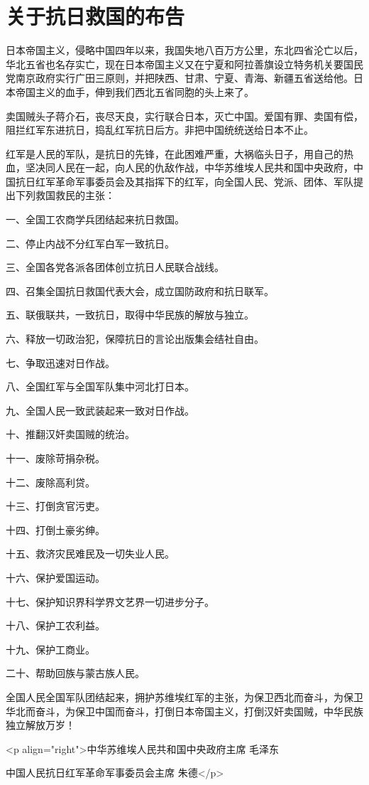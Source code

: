 \section[关于抗日救国的布告（一九三六年六月一日）]{关于抗日救国的布告}


日本帝国主义，侵略中国四年以来，我国失地八百万方公里，东北四省沦亡以后，华北五省也名存实亡，现在日本帝国主义又在宁夏和阿拉善旗设立特务机关要国民党南京政府实行广田三原则，并把陕西、甘肃、宁夏、青海、新疆五省送给他。日本帝国主义的血手，伸到我们西北五省同胞的头上来了。

卖国贼头子蒋介石，丧尽天良，实行联合日本，灭亡中国。爱国有罪、卖国有偿，阻拦红军东进抗日，捣乱红军抗日后方。非把中国统统送给日本不止。

红军是人民的军队，是抗日的先锋，在此困难严重，大祸临头日子，用自己的热血，坚决同人民在一起，向人民的仇敌作战，中华苏维埃人民共和国中央政府，中国抗日红军革命军事委员会及其指挥下的红军，向全国人民、党派、团体、军队提出下列救国救民的主张：

一、全国工农商学兵团结起来抗日救国。

二、停止内战不分红军白军一致抗日。

三、全国各党各派各团体创立抗日人民联合战线。

四、召集全国抗日救国代表大会，成立国防政府和抗日联军。

五、联俄联共，一致抗日，取得中华民族的解放与独立。

六、释放一切政治犯，保障抗日的言论出版集会结社自由。

七、争取迅速对日作战。

八、全国红军与全国军队集中河北打日本。

九、全国人民一致武装起来一致对日作战。

十、推翻汉奸卖国贼的统治。

十一、废除苛捐杂税。

十二、废除高利贷。

十三、打倒贪官污吏。

十四、打倒土豪劣绅。

十五、救济灾民难民及一切失业人民。

十六、保护爱国运动。

十七、保护知识界科学界文艺界一切进步分子。

十八、保护工农利益。

十九、保护工商业。

二十、帮助回族与蒙古族人民。

全国人民全国军队团结起来，拥护苏维埃红军的主张，为保卫西北而奋斗，为保卫华北而奋斗，为保卫中国而奋斗，打倒日本帝国主义，打倒汉奸卖国贼，中华民族独立解放万岁！

<p align="right">中华苏维埃人民共和国中央政府主席 毛泽东

中国人民抗日红军革命军事委员会主席 朱德</p> 

